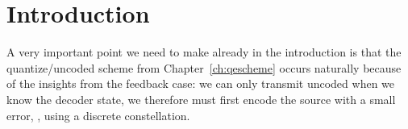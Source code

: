 \chapter*{Introduction}

A very important point we need to make already in the introduction is that the
quantize\slash uncoded scheme from Chapter~\ref{ch:qescheme} occurs naturally
because of the insights from the feedback case: we can only transmit uncoded
when we know the decoder state, we therefore must first encode the source with a
small error, \ie, using a discrete constellation. 

